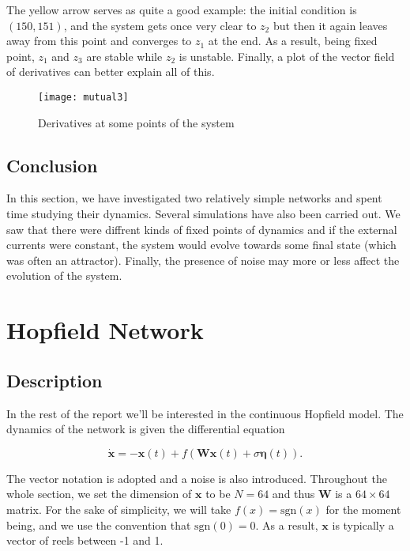 The yellow arrow serves as quite a good example: the initial condition is 
$(150, 151)$, and the system gets once very clear to $z_2$ but then it again
leaves away from this point and converges to $z_1$ at the end. As a result,
being fixed point, $z_1$ and $z_3$ are stable while $z_2$ is unstable. 
Finally, a plot of the vector field of derivatives can better 
explain all of this.

\begin{figure}[H]
  \centering
  \texttt{[image: mutual3]}
  \caption{Derivatives at some points of the system}
\end{figure}

\subsection{Conclusion}

In this section, we have investigated two relatively simple networks and spent
time studying their dynamics. Several simulations have also been carried out.
We saw that there were diffrent kinds of fixed points of dynamics and if the
external currents were constant, the system would evolve towards some final 
state (which was often an attractor). Finally, the presence of noise may more
or less affect the evolution of the system.


\section{Hopfield Network}

\subsection{Description}

In the rest of the report we'll be interested in the continuous Hopfield 
model. The dynamics of the network is given the differential equation

\[\dot{\mathbf{x}} = -\mathbf{x}(t) + f(\mathbf{Wx}(t) + 
  \sigma\mathbf{\eta}(t)).\]

\noindent
The vector notation is adopted and a noise is also introduced.
Throughout the whole section, we set the dimension of $\mathbf{x}$ to be 
$N=64$ and thus $\mathbf{W}$ is a $64\times64$ matrix. For the sake of 
simplicity, we will take $f(x) = \mathrm{sgn}(x)$ for the moment being, and 
we use the convention that $\mathrm{sgn}(0) = 0$. As a result, $\mathbf{x}$
is typically a vector of reels between -1 and 1.

